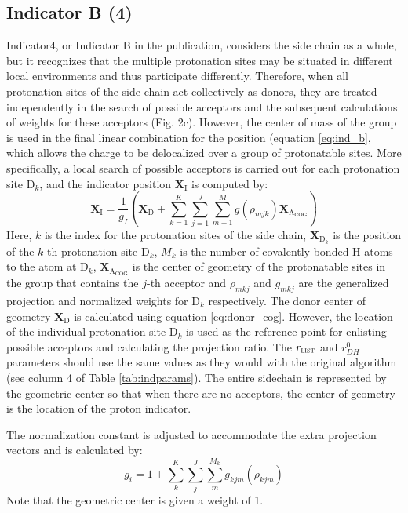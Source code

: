 \documentclass{article}
\newcommand{\mb}[1]{\mathbf{#1}}
\newcommand{\mr}[1]{\mathrm{#1}}
\begin{document}
\subsection{Indicator B (4)}\label{ss:ind_b}
Indicator4, or Indicator B in the publication, considers the side chain as a whole, but it recognizes that the multiple protonation sites may be situated in different local environments and thus participate differently.
Therefore, when all protonation sites of the side chain act collectively as donors, they are treated independently in the search of possible acceptors and the subsequent calculations of weights for these acceptors (Fig. 2c).
However, the center of mass of the group is used in the final linear combination for the position (equation \ref{eq:ind_b}, which allows the charge to be delocalized over a group of protonatable sites.
More specifically, a local search of possible acceptors is carried out for each protonation site $\mr{D}_k$, and the indicator position $\mb{X}_\mr{I}$ is computed by:
\begin{equation}\label{eq:ind_b}
\mathbf{X}_\mr{I} = \frac{1}{g_I} \left( \mathbf{X}_\mr{D} + \sum^K_{k=1} \sum^J_{j=1}   \sum^M_{m-1} g(\rho_{mjk}) \mathbf{X}_{\mr{A}_{\mr{COG}}}  \right) 
\end{equation}
Here, $k$ is the index for the protonation sites of the side chain, $\mathbf{X}_{\mr{D}_k}$ is the position of the $k$-th protonation site $\mr{D}_k$, $M_k$ is the number of covalently bonded H atoms to the atom at $\mr{D}_k$, $\mathbf{X}_{\mr{A}_{\mr{COG}}}$ is the center of geometry of the protonatable sites in the group that contains the $j$-th acceptor  and $\rho_{mkj}$ and $g_{mkj}$ are the generalized projection and normalized weights for $\mr{D}_k$ respectively. 
The donor center of geometry $\mathbf{X}_\mr{D}$ is calculated using equation \ref{eq:donor_cog}.
However, the location of the individual protonation site $\mr{D}_k$ is used as the reference point for enlisting possible acceptors and calculating the projection ratio.
The $r_\mathrm{\textsc{list}}$ and $r^0_{DH}$ parameters should use the same values as they would with the original algorithm (see column 4 of Table \ref{tab:indparams}).
The entire sidechain is represented by the geometric center so that when there are no acceptors, the center of geometry is the location of the proton indicator.

The normalization constant is adjusted to accommodate the extra projection vectors and is calculated by:
\begin{equation}\label{eq:ind_b-normalization}
g_i = 1 + \sum_k^K \sum_j^J \sum_m^{M_k} g_{kjm}(\rho_{kjm})
\end{equation}
Note that the geometric center is given a weight of 1.
\end{document}
